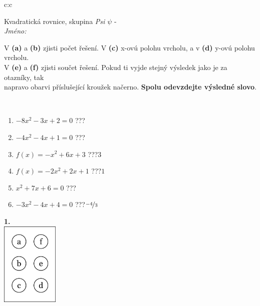 \documentclass[10pt]{report}
\begin{document}
\begin{tabular}{c:c}
\begin{minipage}[c][104.5mm][t]{0.5\linewidth}
\begin{center}
\vspace{7mm}
{\huge Kvadratická rovnice, skupina \textit{Psi $\psi$} -}\\[5mm]
\textit{Jméno:}\phantom{xxxxxxxxxxxxxxxxxxxxxxxxxxxxxxxxxxxxxxxxxxxxxxxxxxxxxxxxxxxxxxxxx}\\[5mm]
\begin{minipage}{0.95\linewidth}
\begin{center}
V \textbf{(a)} a \textbf{(b)} zjisti počet řešení. V \textbf{(c)} x-ovú polohu vrcholu, a v \textbf{(d)} y-ovú polohu vrcholu.\\V \textbf{(e)} a \textbf{(f)} zjisti součet řešení. Pokud ti vyjde stejný výsledek jako je za otazníky, tak\\napravo obarvi příslušející kroužek načerno. \textbf{Spolu odevzdejte výsledné slovo}.
\end{center}
\end{minipage}
\\[1mm]
\begin{minipage}{0.79\linewidth}
\begin{center}
\begin{varwidth}{\linewidth}
\begin{enumerate}
\Large
\item $-8x^2-3x+2=0$\quad \dotfill\; ???\;\dotfill {}
\item $-4x^2-4x+1=0$\quad \dotfill\; ???\;\dotfill {}
\item $f(x)=-x^2+6x+3$\quad \dotfill\; ???\;\dotfill \quad $3$
\item $f(x)=-2x^2+2x+1$\quad \dotfill\; ???\;\dotfill \quad $1$
\item $x^2+7x+6=0$\quad \dotfill\; ???\;\dotfill {}
\item $-3x^2-4x+4=0$\quad \dotfill\; ???\;\dotfill \quad $\nicefrac{-4}{3}$
\end{enumerate}
\end{varwidth}
\end{center}
\end{minipage}
\begin{minipage}{0.20\linewidth}
\begin{center}
{\Huge\bfseries 1.} \\[2mm]
\includegraphics[height=40mm]{../images/braille.png}

\end{center}
\end{minipage}
\end{center}
\end{minipage}
\end{tabular}
\end{document}
